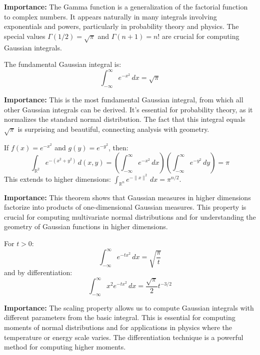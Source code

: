 \noindent\textbf{Importance:} The Gamma function is a generalization of the factorial function to complex numbers. It appears naturally in many integrals involving exponentials and powers, particularly in probability theory and physics. The special values $\Gamma(1/2) = \sqrt{\pi}$ and $\Gamma(n+1) = n!$ are crucial for computing Gaussian integrals.



\begin{theorem}
The fundamental Gaussian integral is:
\[\int_{-\infty}^{\infty} e^{-x^2} \, dx = \sqrt{\pi}\]
\end{theorem}

\noindent\textbf{Importance:} This is the most fundamental Gaussian integral, from which all other Gaussian integrals can be derived. It's essential for probability theory, as it normalizes the standard normal distribution. The fact that this integral equals $\sqrt{\pi}$ is surprising and beautiful, connecting analysis with geometry.



\begin{theorem}
If $f(x) = e^{-x^2}$ and $g(y) = e^{-y^2}$, then:
\[\int_{\mathbb{R}^2} e^{-(x^2 + y^2)} \, d(x, y) = \left(\int_{-\infty}^{\infty} e^{-x^2} \, dx\right) \left(\int_{-\infty}^{\infty} e^{-y^2} \, dy\right) = \pi\]
This extends to higher dimensions: $\int_{\mathbb{R}^n} e^{-\|x\|^2} \, dx = \pi^{n/2}$.
\end{theorem}

\noindent\textbf{Importance:} This theorem shows that Gaussian measures in higher dimensions factorize into products of one-dimensional Gaussian measures. This property is crucial for computing multivariate normal distributions and for understanding the geometry of Gaussian functions in higher dimensions.



\begin{theorem}
For $t > 0$:
\[\int_{-\infty}^{\infty} e^{-tx^2} \, dx = \sqrt{\frac{\pi}{t}}\]
and by differentiation:
\[\int_{-\infty}^{\infty} x^2 e^{-tx^2} \, dx = \frac{\sqrt{\pi}}{2} t^{-3/2}\]
\end{theorem}

\noindent\textbf{Importance:} The scaling property allows us to compute Gaussian integrals with different parameters from the basic integral. This is essential for computing moments of normal distributions and for applications in physics where the temperature or energy scale varies. The differentiation technique is a powerful method for computing higher moments.






